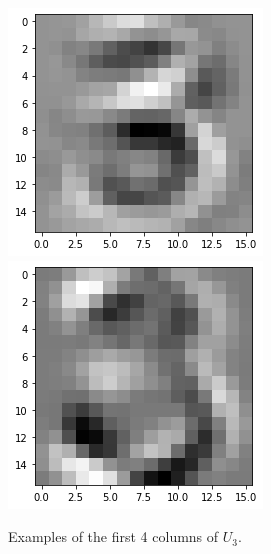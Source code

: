 \documentclass[a4paper,10pt]{report}
\begin{document}
\begin{figure}[!htb]
  \endminipage\hfill
  \includegraphics[width=\linewidth]{3_feature_3.png}
  \endminipage\hfill
  \includegraphics[width=\linewidth]{3_feature_4.png}
  \endminipage\hfill
  \caption{Examples of the first 4 columns of $U_3$.}
  \label{fig:3_feature}
\end{figure}
\end{document}
